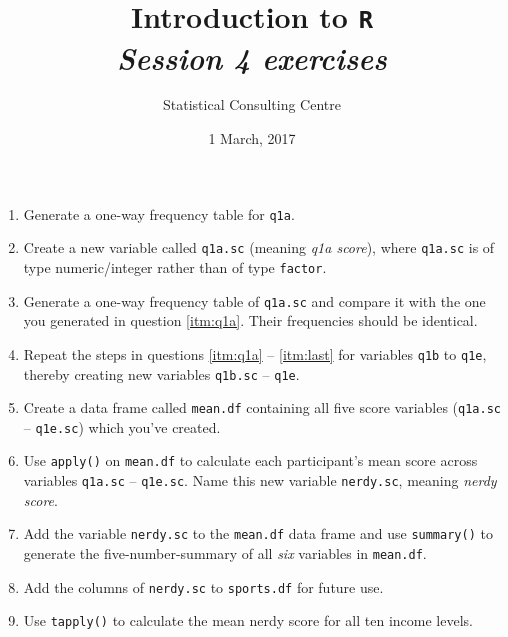 \documentclass[12pt,a4paper]{article}\usepackage[]{graphicx}\usepackage[]{color}
\begin{document}
\setlength\parindent{0cm}
\title{\Large{\textbf{Introduction to \texttt{R}}}\\
\textit{Session 4 exercises}}
\author{Statistical Consulting Centre}
\date{1 March, 2017}
\maketitle
 
 

\begin{enumerate}
\item \label{itm:q1a} Generate a one-way frequency table for \texttt{q1a}.
 
\item Create a new variable called \texttt{q1a.sc} (meaning \emph{q1a score}), where \texttt{q1a.sc} is of type numeric/integer rather than of type \texttt{factor}.
 
\item \label{itm:last} Generate a one-way frequency table of \texttt{q1a.sc} and compare it with the one you generated in question \ref{itm:q1a}. Their frequencies should be identical.
 
\item Repeat the steps in questions \ref{itm:q1a} -- \ref{itm:last} for variables \texttt{q1b} to \texttt{q1e}, thereby creating new variables \texttt{q1b.sc} -- \texttt{q1e}.
 
\item Create a data frame called \texttt{mean.df} containing all five score variables (\texttt{q1a.sc} -- \texttt{q1e.sc}) which you've created. 
 
\item Use \texttt{apply()} on \texttt{mean.df} to calculate each participant's mean score across variables \texttt{q1a.sc} -- \texttt{q1e.sc}. Name this new variable \texttt{nerdy.sc}, meaning \emph{nerdy score}.
 
\item Add the variable \texttt{nerdy.sc} to the \texttt{mean.df} data frame and use \texttt{summary()} to generate the five-number-summary of all \emph{six} variables in \texttt{mean.df}.
 
\item Add the columns of \texttt{nerdy.sc} to \texttt{sports.df} for future use.
 
\item \label{itm:income} Use \texttt{tapply()} to calculate the mean nerdy score for all ten income levels.
 

\end{enumerate}
\end{document}
